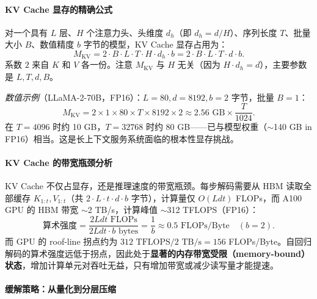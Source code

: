 \documentclass[12pt,a4paper]{article}
\begin{document}
\paragraph{KV Cache 显存的精确公式}

对一个具有 $L$ 层、$H$ 个注意力头、头维度 $d_h$（即 $d_h = d/H$）、序列长度 $T$、批量大小 $B$、数值精度 $b$ 字节的模型，KV Cache 显存占用为：
\begin{equation}
M_{\text{KV}} = 2 \cdot B \cdot L \cdot T \cdot H \cdot d_h \cdot b = 2 \cdot B \cdot L \cdot T \cdot d \cdot b.
\end{equation}
系数 $2$ 来自 $K$ 和 $V$ 各一份。注意 $M_{\text{KV}}$ 与 $H$ 无关（因为 $H \cdot d_h = d$），主要参数是 $L, T, d, B$。

\textit{数值示例}（LLaMA-2-70B，FP16）：$L=80, d=8192, b=2$ 字节，批量 $B=1$：
\begin{equation}
M_{\text{KV}} = 2 \times 1 \times 80 \times T \times 8192 \times 2 \approx 2.56\text{ GB} \times \frac{T}{1024}.
\end{equation}
在 $T=4096$ 时约 10 GB，$T=32768$ 时约 80 GB——已与模型权重（$\sim$140 GB in FP16）相当。这是长上下文服务系统面临的根本性显存挑战。

\paragraph{KV Cache 的带宽瓶颈分析}

KV Cache 不仅占显存，还是推理速度的带宽瓶颈。每步解码需要从 HBM 读取全部缓存 $K_{1:t}, V_{1:t}$（共 $2 \cdot L \cdot t \cdot d \cdot b$ 字节），计算量仅 $O(Ld t)$ FLOPs，而 A100 GPU 的 HBM 带宽 $\sim$2 TB/s，计算峰值 $\sim$312 TFLOPS（FP16）：
\begin{equation}
\text{算术强度} = \frac{2Ldt \text{ FLOPs}}{2Ldt \cdot b \text{ bytes}} = \frac{1}{b} \approx 0.5 \text{ FLOPs/Byte} \quad (b=2).
\end{equation}
而 GPU 的 roof-line 拐点约为 $312 \text{ TFLOPS} / 2 \text{ TB/s} = 156$ FLOPs/Byte。自回归解码的算术强度远低于拐点，因此处于\textbf{显著的内存带宽受限（memory-bound）状态}，增加计算单元对吞吐无益，只有增加带宽或减少读写量才能提速。

\paragraph{缓解策略：从量化到分层压缩}
\end{document}
